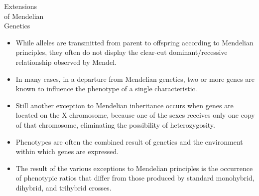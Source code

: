 \clearpage
\thispagestyle{empty}



\makeatletter
\@specialfalse
\makeatother
{}

\begin{specialchapter}[
     image=genetics-dogs,
     image caption={Labrador retriever\\
         puppies expressing\\
         brown (chocolate),\\
         golden (yellow),\\
         and black\\
         coat colors,\\
         traits controlled\\
         by two gene pairs.}]%
{Extensions\\ of Mendelian\\ Genetics}
\begin{itemize}
\item While alleles are transmitted from parent to   offspring
according to Mendelian principles, they often do not
display the clear-cut dominant/recessive relationship
observed by Mendel.
\item In many cases, in a departure from Mendelian genetics,
two or more genes are known to influence the phenotype
of a single characteristic.
\item Still another exception to Mendelian inheritance occurs
when genes are located on the X chromosome, because one
of the sexes receives only one copy of that chromosome,
eliminating the possibility of heterozygosity.
\item Phenotypes are often the combined result of genetics and
the environment within which genes are expressed.
\item The result of the various exceptions to Mendelian principles
is the occurrence of phenotypic ratios that differ from those
produced by standard monohybrid, dihybrid, and trihybrid
crosses.
  \end{itemize}
\end{specialchapter}



